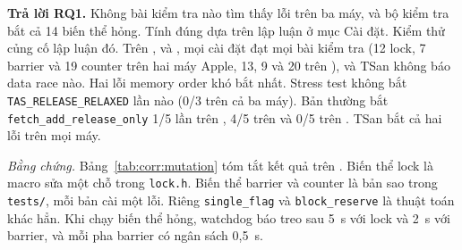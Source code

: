 
\label{sec:corr:mutation}
\begin{rqanswer}\textbf{Trả lời RQ1.} Không bài kiểm tra nào tìm thấy lỗi trên ba máy, và bộ kiểm tra bắt
cả 14 biến thể hỏng. Tính đúng dựa trên lập luận ở mục Cài đặt. Kiểm thử củng cố lập luận đó. Trên
,  và , mọi cài đặt đạt mọi bài kiểm tra (12 lock,
7 barrier và 19 counter trên hai máy Apple, 13, 9 và 20 trên ), và TSan không báo data
race nào. Hai lỗi memory order khó bắt nhất. Stress test không bắt \texttt{TAS\_RELEASE\_RELAXED} lần nào
(0/3 trên cả ba máy). Bản thường bắt \texttt{fetch\_add\_release\_only} 1/5 lần trên ,
4/5 trên  và 0/5 trên . TSan bắt cả hai lỗi trên mọi máy.\end{rqanswer}

\emph{Bằng chứng.} Bảng~\ref{tab:corr:mutation} tóm tắt kết quả trên . Biến thể lock là
macro sửa một chỗ trong \texttt{lock.h}. Biến thể barrier và counter là bản sao trong \texttt{tests/},
mỗi bản cài một lỗi. Riêng \texttt{single\_flag} và \texttt{block\_reserve} là thuật toán khác hẳn. Khi
chạy biến thể hỏng, watchdog báo treo sau 5~s với lock và 2~s với barrier, và mỗi pha barrier có ngân
sách 0,5~s.

